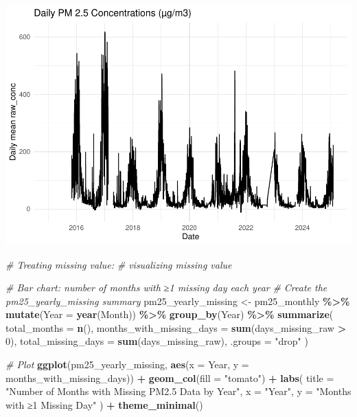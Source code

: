 \documentclass[
]{article}
\newenvironment{Shaded}{\begin{snugshade}}{\end{snugshade}}
\newcommand{\AttributeTok}[1]{\textcolor[rgb]{0.13,0.29,0.53}{#1}}
\newcommand{\CommentTok}[1]{\textcolor[rgb]{0.56,0.35,0.01}{\textit{#1}}}
\newcommand{\DecValTok}[1]{\textcolor[rgb]{0.00,0.00,0.81}{#1}}
\newcommand{\FunctionTok}[1]{\textcolor[rgb]{0.13,0.29,0.53}{\textbf{#1}}}
\newcommand{\NormalTok}[1]{#1}
\newcommand{\OtherTok}[1]{\textcolor[rgb]{0.56,0.35,0.01}{#1}}
\newcommand{\SpecialCharTok}[1]{\textcolor[rgb]{0.81,0.36,0.00}{\textbf{#1}}}
\newcommand{\StringTok}[1]{\textcolor[rgb]{0.31,0.60,0.02}{#1}}
\begin{document}
\includegraphics{v_1_files/figure-latex/read-pm25-1.pdf}

\begin{Shaded}
\begin{Highlighting}[]
\CommentTok{\# Treating missing value: }
\CommentTok{\# visualizing missing value}

\CommentTok{\# Bar chart: number of months with ≥1 missing day each year}
\CommentTok{\# Create the pm25\_yearly\_missing summary}
\NormalTok{pm25\_yearly\_missing }\OtherTok{\textless{}{-}}\NormalTok{ pm25\_monthly }\SpecialCharTok{\%\textgreater{}\%}
  \FunctionTok{mutate}\NormalTok{(}\AttributeTok{Year =} \FunctionTok{year}\NormalTok{(Month)) }\SpecialCharTok{\%\textgreater{}\%}
  \FunctionTok{group\_by}\NormalTok{(Year) }\SpecialCharTok{\%\textgreater{}\%}
  \FunctionTok{summarize}\NormalTok{(}
    \AttributeTok{total\_months               =} \FunctionTok{n}\NormalTok{(),}
    \AttributeTok{months\_with\_missing\_days   =} \FunctionTok{sum}\NormalTok{(days\_missing\_raw }\SpecialCharTok{\textgreater{}} \DecValTok{0}\NormalTok{),}
    \AttributeTok{total\_missing\_days         =} \FunctionTok{sum}\NormalTok{(days\_missing\_raw),}
    \AttributeTok{.groups =} \StringTok{"drop"}
\NormalTok{  )}

\CommentTok{\# Plot}
\FunctionTok{ggplot}\NormalTok{(pm25\_yearly\_missing, }\FunctionTok{aes}\NormalTok{(}\AttributeTok{x =}\NormalTok{ Year, }\AttributeTok{y =}\NormalTok{ months\_with\_missing\_days)) }\SpecialCharTok{+}
  \FunctionTok{geom\_col}\NormalTok{(}\AttributeTok{fill =} \StringTok{"tomato"}\NormalTok{) }\SpecialCharTok{+}
  \FunctionTok{labs}\NormalTok{(}
    \AttributeTok{title =} \StringTok{"Number of Months with Missing PM2.5 Data by Year"}\NormalTok{,}
    \AttributeTok{x     =} \StringTok{"Year"}\NormalTok{,}
    \AttributeTok{y     =} \StringTok{"Months with ≥1 Missing Day"}
\NormalTok{  ) }\SpecialCharTok{+}
  \FunctionTok{theme\_minimal}\NormalTok{()}
\end{Highlighting}
\end{Shaded}
\end{document}
